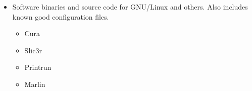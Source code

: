 \begin{itemize}
\item Software binaries and source code for GNU/Linux and others. Also includes known good configuration files.
\begin{itemize} %
\item{Cura}
\item Slic3r
\item Printrun
\item Marlin
\end{itemize} %

\end{itemize}

